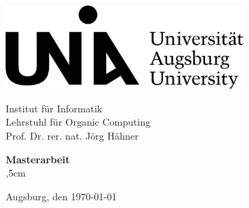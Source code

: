 \begin{titlepage}
\begin{large}
\begin{center}
\includegraphics[width=9cm]{uni-augsburg-logo.jpg}

Institut f\"ur Informatik\\
Lehrstuhl f\"ur Organic Computing\\
Prof. Dr. rer. nat. J\"org H\"ahner\\
\vskip 2cm



\textbf{\Large Masterarbeit}\\
,5cm
{\LARGE\bfseries\textsf \titel \par}
\vfill

\vfill

Augsburg, den \today

\end{center}
\vfill
\newpage
\thispagestyle{empty}
\end{large}
\end{titlepage}